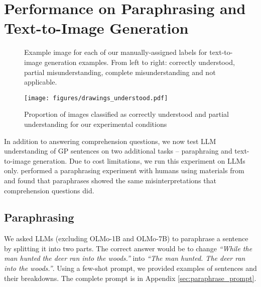 \section{Performance on Paraphrasing and Text-to-Image Generation}

\begin{figure*}[t]
    \centering
    \scriptsize
    \qquad
    \qquad
    \qquad
    \caption{Example image for each of our manually-assigned labels for text-to-image generation examples. From left to right: correctly understood, partial misunderstanding, complete misunderstanding and not applicable.}
    \label{fig:dalle_classes}
\end{figure*}

\begin{figure}[t!]
    \centering
    \texttt{[image: figures/drawings\_understood.pdf]}
    \caption{Proportion of images classified as correctly understood and partial understanding for our experimental conditions}
    \label{fig:drawing_classes}
    \vspace{-0.3cm}
\end{figure}

In addition to answering comprehension questions, 
we now test LLM understanding of GP sentences on two additional tasks -- paraphraing and text-to-image generation. Due to cost limitations, we run this experiment on LLMs only. \citet{patson2009lingering} performed a paraphrasing experiment with humans using materials from \citet{christianson2001} and found that paraphrases showed the same misinterpretations that comprehension questions did. 


\subsection{Paraphrasing}

We asked LLMs (excluding OLMo-1B and OLMo-7B) to paraphrase a sentence by splitting it into two parts. The correct answer would be to change \emph{``While the man hunted the deer ran into the woods.''} into \emph{``The man hunted. The deer ran into the woods.''}. Using a few-shot prompt, we provided examples of sentences and their breakdowns. The complete prompt is in Appendix \ref{sec:paraphrase_prompt}.

